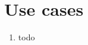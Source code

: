 \newpage
\section{\Large{Use cases}}

\begin{enumerate}[label=\arabic*]
    \item todo
\end{enumerate}